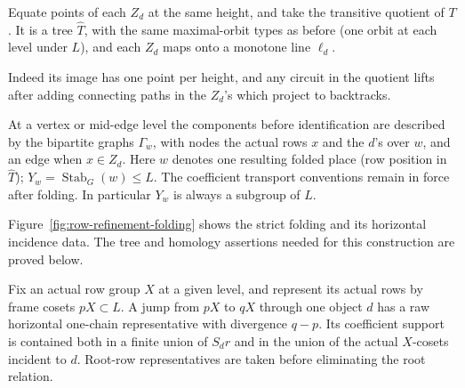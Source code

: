 Equate points of each \(Z_d\) at the same height, and take the transitive quotient of \(T\). It is a tree \(\widehat T\), with the same maximal-orbit types as before (one orbit at each level under \(L\)), and each \(Z_d\) maps onto a monotone line \(\ell_d\).

Indeed its image has one point per height, and any circuit in the quotient lifts after adding connecting paths in the \(Z_d\)'s which project to backtracks.

At a vertex or mid-edge level the components before identification are described by the bipartite graphs \(\Gamma_w\), with nodes the actual rows \(x\) and the \(d\)'s over \(w\), and an edge when \(x\in Z_d\). Here \(w\) denotes one resulting folded place (row position in \(\widehat T\)); \(Y_w=\operatorname{Stab}_G(w)\le L\). 
The coefficient transport conventions remain in force after folding.
In particular $Y_w$ is always a subgroup of $L$.

Figure~\ref{fig:row-refinement-folding} shows the strict folding and
its horizontal incidence data. The tree and homology assertions needed
for this construction are proved below.


\begin{lemma}\label{close:raw-jumps}
Fix an actual row group $X$ at a given level, and represent its actual
rows by frame cosets $pX\subset L$. A jump from $pX$ to $qX$ through
one object $d$ has a raw horizontal one-chain representative with
divergence $q-p$. Its coefficient support is contained both in a
finite union of $S_dr$ and in the union of the actual $X$-cosets
incident to $d$. Root-row representatives are taken before eliminating
the root relation.
\end{lemma}

